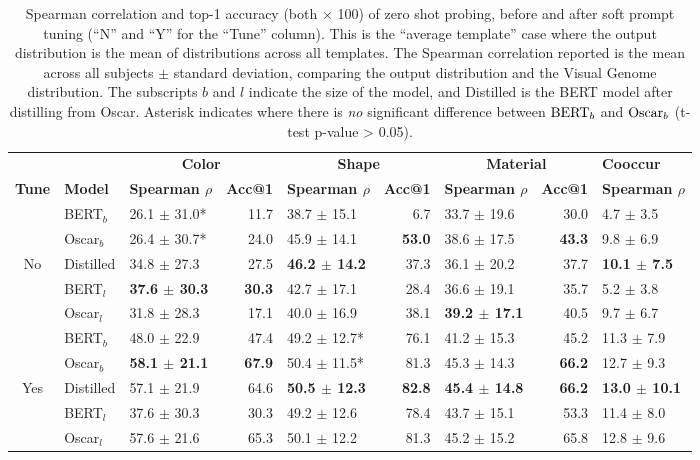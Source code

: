 \documentclass[11pt]{article}
\begin{document}
\begin{table*}[ht]
\small
\centering
\begin{tabular}{cl|lr|lr|lr|l}
\hline
 & & \multicolumn{2}{c|}{\textbf{Color}} & \multicolumn{2}{c|}{\textbf{Shape}} & \multicolumn{2}{c|}{\textbf{Material}} & \textbf{Cooccur}\\
\cmidrule(lr){3-4}\cmidrule(lr){5-6}\cmidrule(lr){7-8}\cmidrule(lr){9-9}
\textbf{Tune} & \textbf{Model} & \textbf{Spearman $\rho$} & \textbf{Acc@1} & \textbf{Spearman $\rho$} & \textbf{Acc@1} & \textbf{Spearman $\rho$} & \textbf{Acc@1} & \textbf{Spearman $\rho$}\\
\hline
 & BERT$_b$ & 26.1 $\pm$ 31.0* & 11.7 & 38.7 $\pm$ 15.1 & 6.7 & 33.7 $\pm$ 19.6 & 30.0 & 4.7 $\pm$ 3.5\\
 & Oscar$_b$ & 26.4 $\pm$ 30.7* & 24.0 & 45.9 $\pm$ 14.1 & \textbf{53.0} & 38.6 $\pm$ 17.5 & \textbf{43.3} & 9.8 $\pm$ 6.9\\
 No & Distilled & 34.8 $\pm$ 27.3 & 27.5 & \textbf{46.2 $\pm$ 14.2} & 37.3 & 36.1 $\pm$ 20.2 & 37.7 & \textbf{10.1 $\pm$ 7.5}\\
 & BERT$_l$ & \textbf{37.6 $\pm$ 30.3} & \textbf{30.3} & 42.7 $\pm$ 17.1 & 28.4 & 36.6 $\pm$ 19.1 & 35.7 & 5.2 $\pm$ 3.8\\
 & Oscar$_l$ & 31.8 $\pm$ 28.3 & 17.1 & 40.0 $\pm$ 16.9 & 38.1 & \textbf{39.2 $\pm$ 17.1} & 40.5 & 9.7 $\pm$ 6.7\\
\hline
 & BERT$_b$ & 48.0 $\pm$ 22.9 & 47.4 & 49.2 $\pm$ 12.7* & 76.1 & 41.2 $\pm$ 15.3 & 45.2 & 11.3 $\pm$ 7.9\\
 & Oscar$_b$ & \textbf{58.1 $\pm$ 21.1} & \textbf{67.9} & 50.4 $\pm$ 11.5* & 81.3 & 45.3 $\pm$ 14.3 & \textbf{66.2} & 12.7 $\pm$ 9.3\\
Yes & Distilled & 57.1 $\pm$ 21.9 & 64.6 & \textbf{50.5 $\pm$ 12.3} & \textbf{82.8} & \textbf{45.4 $\pm$ 14.8} & \textbf{66.2} & \textbf{13.0 $\pm$ 10.1}\\
 & BERT$_l$ & 37.6 $\pm$ 30.3 & 30.3 & 49.2 $\pm$ 12.6 & 78.4 & 43.7 $\pm$ 15.1 & 53.3 & 11.4 $\pm$ 8.0\\
 & Oscar$_l$ & 57.6 $\pm$ 21.6 & 65.3 & 50.1 $\pm$ 12.2 & 81.3 & 45.2 $\pm$ 15.2 & 65.8 & 12.8 $\pm$ 9.6\\
\hline
\end{tabular}
\caption{\label{zero_shot_avg_all}
Spearman correlation and top-1 accuracy (both $\times$ 100) of zero shot probing, before and after soft prompt tuning (``N'' and ``Y'' for the ``Tune'' column). This is the ``average template'' case where the output distribution is the mean of distributions across all templates. The Spearman correlation reported is the mean across all subjects $\pm$ standard deviation, comparing the output distribution and the Visual Genome distribution. The subscripts $b$ and $l$ indicate the size of the model, and Distilled is the BERT model after distilling from Oscar. Asterisk indicates where there is \emph{no} significant difference between $\textnormal{BERT}_b$ and $\textnormal{Oscar}_b$ (t-test p-value > 0.05).}
\vspace{-1em}
\end{table*}
\end{document}
